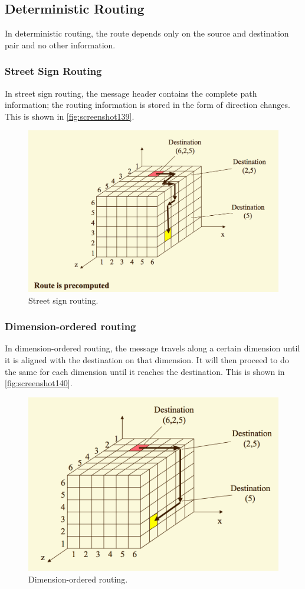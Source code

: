 \subsection{Deterministic Routing}
In deterministic routing, the route depends only on the source and destination pair and no other information.

\subsubsection{Street Sign Routing}
In street sign routing, the message header contains the complete path information; the routing information is stored in the form of direction changes. This is shown in \autoref{fig:screenshot139}.

\begin{figure}
\centering
\includegraphics[width=0.7\linewidth]{figures/screenshot139}
\caption{Street sign routing.}
\label{fig:screenshot139}
\end{figure}

\subsubsection{Dimension-ordered routing}
In dimension-ordered routing, the message travels along a certain dimension until it is aligned with the destination on that dimension. It will then proceed to do the same for each dimension until it reaches the destination. This is shown in \autoref{fig:screenshot140}.

\begin{figure}
\centering
\includegraphics[width=0.7\linewidth]{figures/screenshot140}
\caption{Dimension-ordered routing.}
\label{fig:screenshot140}
\end{figure}

